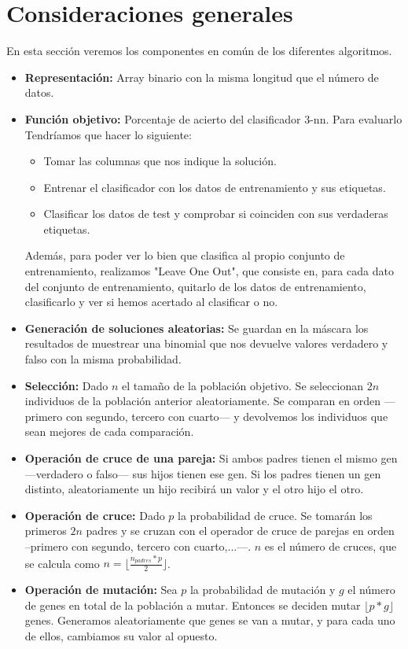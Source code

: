 \section{Consideraciones generales}
En esta sección veremos los componentes en común de los diferentes algoritmos.
\begin{itemize}
\item \textbf{Representación:} Array binario con la misma longitud que el número de datos.
\item \textbf{Función objetivo:} Porcentaje de acierto del clasificador 3-nn. Para evaluarlo Tendríamos que hacer lo siguiente:
\begin{itemize}
\item Tomar las columnas que nos indique la solución.
\item Entrenar el clasificador con los datos de entrenamiento y sus etiquetas.
\item Clasificar los datos de test y comprobar si coinciden con sus verdaderas etiquetas.
\end{itemize} 
Además, para poder ver lo bien que clasifica al propio conjunto de entrenamiento, realizamos "Leave One Out", que consiste en, para cada dato del conjunto de entrenamiento, quitarlo de los datos de entrenamiento, clasificarlo y ver si hemos acertado al clasificar o no.
\item \textbf{Generación de soluciones aleatorias:} Se guardan en la máscara los resultados de muestrear una binomial que nos devuelve valores verdadero y falso con la misma probabilidad.
\item \textbf{Selección:} Dado $n$ el tamaño de la población objetivo. Se seleccionan $2n$ individuos de la población anterior aleatoriamente. Se comparan en orden --- primero con segundo, tercero con cuarto--- y devolvemos los individuos que sean mejores de cada comparación.
\item \textbf{Operación de cruce de una pareja:} Si ambos padres tienen el mismo gen ---verdadero o falso--- sus hijos tienen ese gen. Si los padres tienen un gen distinto, aleatoriamente un hijo recibirá un valor y el otro hijo el otro.
\item \textbf{Operación de cruce:} Dado $p$ la probabilidad de cruce. Se tomarán los primeros $2n$ padres y se cruzan con el operador de cruce de parejas en orden --primero con segundo, tercero con cuarto,...---. $n$ es el número de cruces, que se calcula como $n = \lfloor\frac{n_{padres} * p}{2}\rfloor$.
\item \textbf{Operación de mutación:} Sea $p$ la probabilidad de mutación y $g$ el número de genes en total de la población a mutar. Entonces se deciden mutar $\lfloor p*g \rfloor$ genes. Generamos aleatoriamente que genes se van a mutar, y para cada uno de ellos, cambiamos su valor al opuesto.
\end{itemize} 
\newpage

